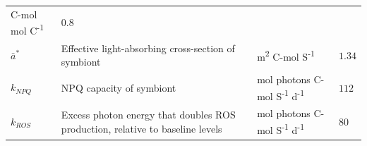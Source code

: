 \documentclass[]{elsarticle} %
\begin{document}
\begin{longtable}[]{@{}llll@{}}
\begin{minipage}[t]{0.24\columnwidth}
C-mol mol C\textsuperscript{-1}\strut
\end{minipage} & \begin{minipage}[t]{0.12\columnwidth}\raggedright\strut
\(0.8\)\strut
\end{minipage}\tabularnewline
\begin{minipage}[t]{0.09\columnwidth}\raggedright\strut
\(\bar{a}^*\)\strut
\end{minipage} & \begin{minipage}[t]{0.44\columnwidth}\raggedright\strut
Effective light-absorbing cross-section of symbiont\strut
\end{minipage} & \begin{minipage}[t]{0.24\columnwidth}\raggedright\strut
m\textsuperscript{2} C-mol S\textsuperscript{-1}\strut
\end{minipage} & \begin{minipage}[t]{0.12\columnwidth}\raggedright\strut
\(1.34\)\strut
\end{minipage}\tabularnewline
\begin{minipage}[t]{0.09\columnwidth}\raggedright\strut
\(k_{NPQ}\)\strut
\end{minipage} & \begin{minipage}[t]{0.44\columnwidth}\raggedright\strut
NPQ capacity of symbiont\strut
\end{minipage} & \begin{minipage}[t]{0.24\columnwidth}\raggedright\strut
mol photons C-mol S\textsuperscript{-1} d\textsuperscript{-1}\strut
\end{minipage} & \begin{minipage}[t]{0.12\columnwidth}\raggedright\strut
\(112\)\strut
\end{minipage}\tabularnewline
\begin{minipage}[t]{0.09\columnwidth}\raggedright\strut
\(k_{ROS}\)\strut
\end{minipage} & \begin{minipage}[t]{0.44\columnwidth}\raggedright\strut
Excess photon energy that doubles ROS production, relative to baseline
levels\strut
\end{minipage} & \begin{minipage}[t]{0.24\columnwidth}\raggedright\strut
mol photons C-mol S\textsuperscript{-1} d\textsuperscript{-1}\strut
\end{minipage} & \begin{minipage}[t]{0.12\columnwidth}\raggedright\strut
\(80\)\strut
\end{minipage}\tabularnewline

\end{longtable}
\end{document}
